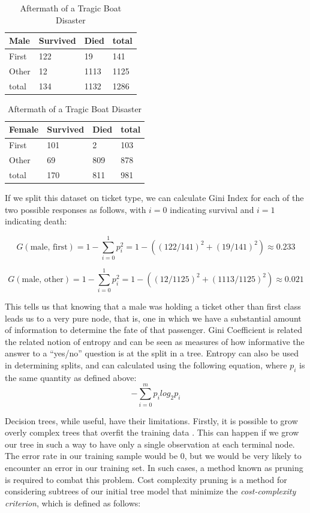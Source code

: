 \documentclass[preprint,12pt]{elsarticle}
\begin{document}
\begin{table}[h]
\begin{tabular}{|l | l l | l|}
\hline
 Male & Survived & Died & total\\
\hline
First & 122 & 19 & 141 \\
Other & 12 & 1113 & 1125 \\
\hline
total & 134 & 1132 & 1286 \\
\hline
\end{tabular}
\quad
\begin{tabular}{|l | l l | l|}
\hline
Female & Survived & Died & total\\
\hline
First & 101 & 2 & 103 \\
Other & 69 & 809 & 878 \\
\hline
total & 170 & 811 & 981 \\
\hline
\end{tabular}

\caption{Aftermath of a Tragic Boat Disaster}
\end{table}

\noindent If we split this dataset on ticket type, we can calculate Gini Index for each of the two possible responses as follows, with $i=0$ indicating survival and $i=1$ indicating death:

$$G(\textrm{male, first}) = 1 - \sum\limits_{i=0}^1 p_{i}^{2} = 1 - ((122/141)^{2}+(19/141)^{2}) \approx 0.233 $$

$$G(\textrm{male, other}) = 1 - \sum\limits_{i=0}^1 p_{i}^{2} = 1 - ((12/1125)^{2}+(1113/1125)^{2}) \approx 0.021 $$

\noindent This tells us that knowing that a male was holding a ticket other than first class leads us to a very pure node, that is, one in which we have a substantial amount of information to determine the fate of that passenger. Gini Coefficient is related the related notion of entropy and can be seen as measures of how informative the answer to a ``yes/no'' question is at the split in a tree. Entropy can also be used in determining splits, and can calculated using the following equation, where $p_{i}$ is the same quantity as defined above: 
$$-\sum\limits_{i=0}^m p_{i}log_{2}p_{i}$$

Decision trees, while useful, have their limitations. Firstly, it is possible to grow overly complex trees that overfit the training data \cite{ISLR}. This can happen if we grow our tree in such a way to have only a single observation at each terminal node. The error rate in our training sample would be $0$, but we would be very likely to encounter an error in our training set. In such cases, a method known as pruning is required to combat this problem. Cost complexity pruning is a method for considering subtrees of our initial tree model that minimize the \textit{cost-complexity criterion}, which is defined as follows\cite{ESL}:
\end{document}
